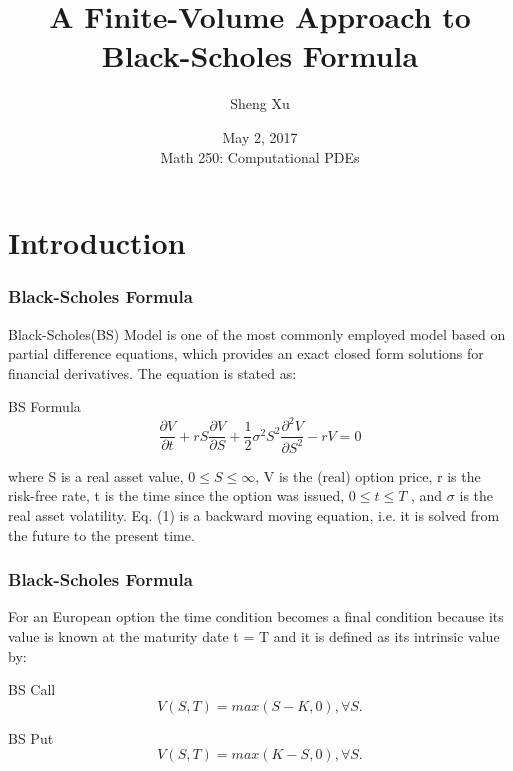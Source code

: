 \documentclass[blue]{beamer}
\title[ FVM to BS]{A Finite-Volume Approach to Black-Scholes Formula}
\author[XU]{ Sheng Xu}
\date[May 2, 2017]{May 2, 2017\\Math 250: Computational PDEs}
\institute[Tufts]{Tufts University\\Department of Mathematics}
\begin{document}
\begin{frame}

\titlepage

\end{frame}

\section{Introduction}

\begin{frame}
\frametitle{Black-Scholes Formula}
Black-Scholes(BS) Model\cite{BS} is one of the most commonly employed model based on partial difference equations, which provides an exact closed form solutions for financial derivatives. The equation is stated as: 
\begin{block}{BS Formula}
\begin{equation}
\frac{\partial V}{\partial t}+rS \frac{\partial V}{\partial S}+\frac{1}{2} \sigma ^2 S^2 \frac{\partial ^2 V}{\partial S ^2}-rV=0
\end{equation}
\end{block}
where S is a real asset value, $0 \leq S \leq \infty$, V is the (real) option price, r is the risk-free rate, t is the time since the option was
issued, $0 \leq t \leq T$ , and $\sigma$ is the real asset volatility. Eq. (1) is a backward moving equation, i.e. it is solved from
the future to the present time.\\

\end{frame}

\begin{frame}
\frametitle{Black-Scholes Formula}
For an European option the time condition becomes a final condition because its value is known at the maturity date
t = T and it is defined as its intrinsic value by:
\begin{block}{BS Call}
\begin{equation}
V(S, T ) = max(S - K, 0), \forall S.
\end{equation}
\end{block}
\begin{block}{BS Put}
	\begin{equation}
	V(S, T ) = max(K - S, 0), \forall S.
	\end{equation}
\end{block}
\end{frame}
\end{document}

